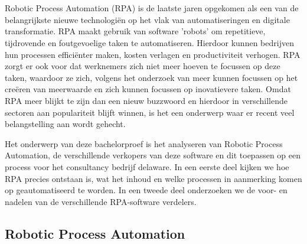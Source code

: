 \chapter{}%
\label{ch:stand-van-zaken}

Robotic Process Automation (RPA) is de laatste jaren opgekomen als een van de belangrijkste nieuwe technologiën op het vlak van automatiseringen en digitale transformatie. RPA maakt gebruik van software 'robots' om repetitieve, tijdrovende en foutgevoelige taken te automatiseren. Hierdoor kunnen bedrijven hun processen efficiënter maken, kosten verlagen en productiviteit verhogen. 
RPA zorgt er ook voor dat werknemers zich niet meer hoeven te focussen op deze taken, waardoor ze zich, volgens het onderzoek van \textcite{ZalewskaTurzynska2022} meer kunnen focussen op het creëren van meerwaarde en zich kunnen focussen op inovatievere taken. Omdat RPA meer blijkt te zijn dan een nieuw buzzwoord en hierdoor in verschillende sectoren aan populariteit blijft winnen, is het een onderwerp waar er recent veel belangstelling aan wordt gehecht.




Het onderwerp van deze bachelorproef is het analyseren van Robotic Process Automation, de verschillende verkopers van deze software en dit toepassen op een process voor het consultancy bedrijf delaware. In een eerste deel kijken we hoe RPA precies ontstaan is, wat het inhoud en welke processen in aanmerking komen op geautomatiseerd te worden. In een tweede deel onderzoeken we de voor- en nadelen van de verschillende RPA-software verdelers.

\section{Robotic Process Automation}

